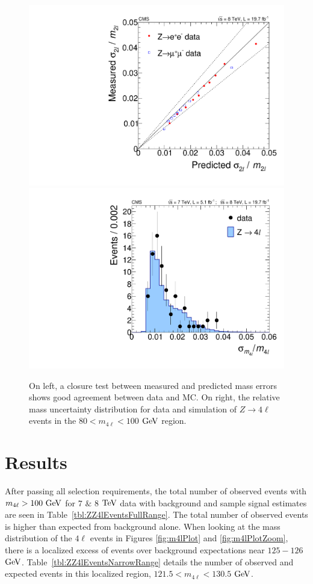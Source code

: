 \begin{figure}[htbp]
\begin{center}
\includegraphics[width=.45\linewidth]{HiggsDiscovery/figures/DmassValid_Z2l.pdf}
\includegraphics[width=.45\linewidth]{HiggsDiscovery/figures/Dmass_Z4l.pdf}
\caption[Calibration and Closure Test of Per-Event Mass Errors in $4\ell$]{On left, a closure test between measured and predicted mass errors shows good agreement between data and MC. On right, the relative mass uncertainty distribution for data and simulation of $Z\rightarrow 4\ell$ events in the $80 < m_{4\ell} < 100$ $\rm{GeV}$ region.}
\label{fig:PerEventMassErrors}
\end{center}
\end{figure}

\section{Results}
\label{sec:ZZ4lResults}

After passing all selection requirements, the total number of observed events with $m_{4\ell} > 100~\rm{GeV}$ for $7$ $\&$ $8$ $\rm{TeV}$ data with background and sample signal estimates are seen in Table~\ref{tbl:ZZ4lEventsFullRange}. The total number of observed events is higher than expected from background alone. When looking at the mass distribution of the $4\ell$ events in Figures \ref{fig:m4lPlot} and \ref{fig:m4lPlotZoom}, there is a localized excess of events over background expectations near $125-126$ $\rm{GeV}$. Table~\ref{tbl:ZZ4lEventsNarrowRange} details the number of observed and expected events in this localized region, $121.5 < m_{4\ell} < 130.5$ $\rm{GeV}$. 

